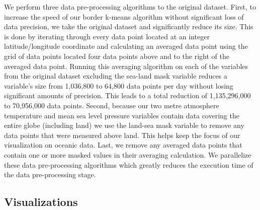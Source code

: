 \documentclass[conference,compsoc]{IEEEtran}
\begin{document}
We perform three data pre-processing algorithms to the original dataset. First, to increase the speed of our border k-means algorithm without significant loss of data precision, we take the original dataset and significantly reduce its size. This is done by iterating through every data point located at an integer latitude/longitude coordinate and calculating an averaged data point using the grid of data points located four data points above and to the right of the averaged data point. Running this averaging algorithm on each of the variables from the original dataset excluding the sea-land mask variable reduces a variable's size from 1,036,800 to 64,800 data points per day without losing significant amounts of precision. This leads to a total reduction of 1,135,296,000 to 70,956,000 data points. Second, because our two metre atmosphere temperature and mean sea level pressure variables contain data covering the entire globe (including land) we use the land-sea mask variable to remove any data points that were measured above land. This helps keep the focus of our visualization on oceanic data. Last, we remove any averaged data points that contain one or more masked values in their averaging calculation. We parallelize these data pre-processing algorithms which greatly reduces the execution time of the data pre-processing stage.

\subsection{Visualizations}
\end{document}
